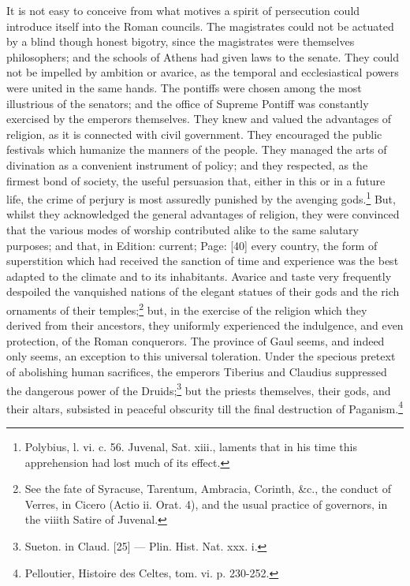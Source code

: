 It is not easy to conceive from what motives a spirit of persecution could introduce itself into the Roman councils. The magistrates could not be actuated by a blind though honest bigotry, since the magistrates were themselves philosophers; and the schools of Athens had given laws to the senate. They could not be impelled by ambition or avarice, as the temporal and ecclesiastical powers were united in the same hands. The pontiffs were chosen among the most illustrious of the senators; and the office of Supreme Pontiff was constantly exercised by the emperors themselves. They knew and valued the advantages of religion, as it is connected with civil government. They encouraged the public festivals which humanize the manners of the people. They managed the arts of divination as a convenient instrument of policy; and they respected, as the firmest bond of society, the useful persuasion that, either in this or in a future life, the crime of perjury is most assuredly punished by the avenging gods.\footnote{Polybius, l. vi. c. 56. Juvenal, Sat. xiii., laments that in his time this apprehension had lost much of its effect.} But, whilst they acknowledged the general advantages of religion, they were convinced that the various modes of worship contributed alike to the same salutary purposes; and that, in Edition: current; Page: [40] every country, the form of superstition which had received the sanction of time and experience was the best adapted to the climate and to its inhabitants. Avarice and taste very frequently despoiled the vanquished nations of the elegant statues of their gods and the rich ornaments of their temples;\footnote{See the fate of Syracuse, Tarentum, Ambracia, Corinth, \&c., the conduct of Verres, in Cicero (Actio ii. Orat. 4), and the usual practice of governors, in the viiith Satire of Juvenal.} but, in the exercise of the religion which they derived from their ancestors, they uniformly experienced the indulgence, and even protection, of the Roman conquerors. The province of Gaul seems, and indeed only seems, an exception to this universal toleration. Under the specious pretext of abolishing human sacrifices, the emperors Tiberius and Claudius suppressed the dangerous power of the Druids;\footnote{Sueton. in Claud. [25] \texthebrew{—} Plin. Hist. Nat. xxx. i.} but the priests themselves, their gods, and their altars, subsisted in peaceful obscurity till the final destruction of Paganism.\footnote{Pelloutier, Histoire des Celtes, tom. vi. p. 230-252.}

